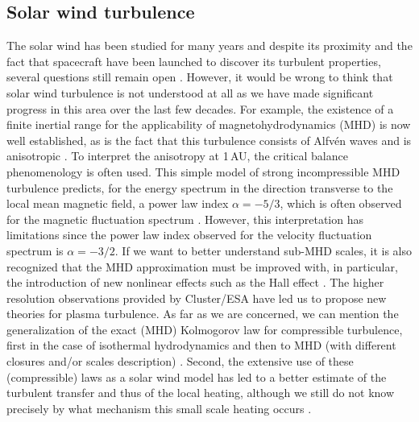 \documentclass{jpp}
\begin{document}
\subsection{Solar wind turbulence}
The solar wind has been studied for many years and despite its proximity and the fact that spacecraft have been launched to discover its turbulent properties, several questions still remain open \citep{Goldstein1999,Bruno2013,Sahraoui2020}. However, it would be wrong to think that solar wind turbulence is not understood at all as we have made significant progress in this area over the last few decades. For example, the existence of a finite inertial range for the applicability of magnetohydrodynamics (MHD) is now well established, as is the fact that this turbulence consists of Alfv\'en waves and is anisotropic \citep{Matthaeus2021}. To interpret the anisotropy at 1\,AU, the critical balance phenomenology \citep{Higdon1984,Goldreich1995,Oughton2020} is often used. This simple model of strong incompressible MHD turbulence predicts, for the energy spectrum in the direction transverse to the local mean magnetic field, a power law index $\alpha = -5/3$, which is often observed for the magnetic fluctuation spectrum \citep{Podesta2007}. However, this interpretation has limitations since the power law index observed for the velocity fluctuation spectrum is $\alpha = -3/2$. If we want to better understand sub-MHD scales, it is also recognized that the MHD approximation must be improved with, in particular, the introduction of new nonlinear effects such as the Hall effect \citep{Galtier2006,Passot2019}. 
The higher resolution observations provided by Cluster/ESA \citep{Bale2005,Kiyani2015} have led us to propose new theories for plasma turbulence. As far as we are concerned, we can mention the generalization of the exact (MHD) Kolmogorov law \citep{K41,Politano1998b,Galtier2008b} for compressible turbulence, first in the case of isothermal hydrodynamics \citep{Galtier2011} and then to MHD (with different closures and/or scales description) \citep{Banerjee2013,Andres2018,Ferrand2021,Simon2022}. Second, the extensive use of these (compressible) laws as a solar wind model has led to a better estimate of the turbulent transfer and thus of the local heating, although we still do not know precisely by what mechanism this small scale heating occurs \citep{Sorriso2007,Osman2011,Banerjee2016,Hadid2017,Bandyopadhyay2020,Marino2023}. 
\end{document}
